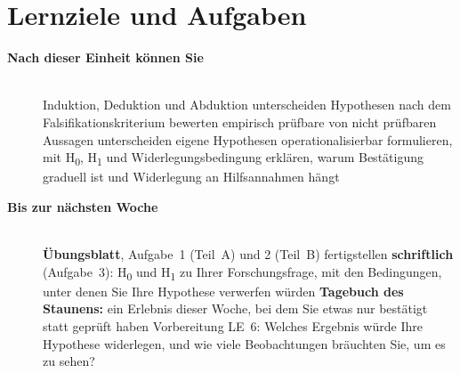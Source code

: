 \section{Lernziele und Aufgaben}
\begin{description}
\item[{\rot\bf Nach dieser Einheit können Sie}]~\\[-\lblskip]
\bi
  \ite Induktion, Deduktion und Abduktion unterscheiden
  \ite Hypothesen nach dem Falsifikationskriterium bewerten
  \ite empirisch prüfbare von nicht prüfbaren Aussagen unterscheiden
  \ite eigene Hypothesen operationalisierbar formulieren, mit
    H\textsubscript{0}, H\textsubscript{1} und Widerlegungsbedingung
  \ite erklären, warum Bestätigung graduell ist und Widerlegung an
    Hilfsannahmen hängt
\ei
\os{\newpage}

\item[{\rot\bf Bis zur nächsten Woche}]~\\[-\lblskip]
\bi
  \ite \textbf{Übungsblatt}, Aufgabe~1 (Teil~A) und 2 (Teil~B) fertigstellen
  \ite \textbf{schriftlich} (Aufgabe~3): H\textsubscript{0} und
    H\textsubscript{1} zu Ihrer Forschungsfrage, mit den Bedingungen, unter
    denen Sie Ihre Hypothese verwerfen würden
  \ite \textbf{Tagebuch des Staunens:} ein Erlebnis dieser Woche, bei dem
    Sie etwas nur bestätigt statt geprüft haben
  \ite Vorbereitung LE~6: Welches Ergebnis würde Ihre Hypothese widerlegen,
    und wie viele Beobachtungen bräuchten Sie, um es zu sehen?
\ei
\os{\newpage}
\end{description}

